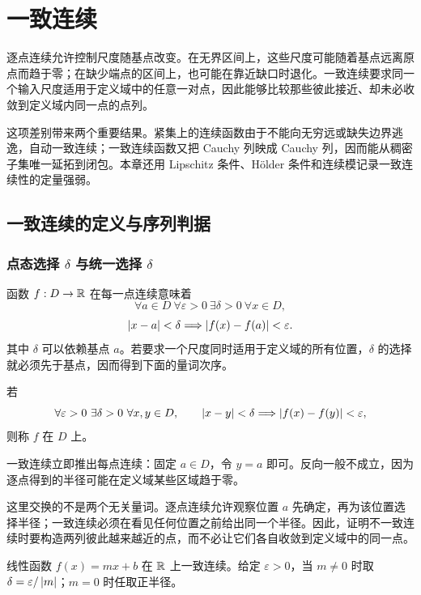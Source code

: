 \chapter{一致连续}
\label{chap:uniform-continuity}

逐点连续允许控制尺度随基点改变。在无界区间上，这些尺度可能随着基点远离原点而趋于零；在缺少端点的区间上，也可能在靠近缺口时退化。一致连续要求同一个输入尺度适用于定义域中的任意一对点，因此能够比较那些彼此接近、却未必收敛到定义域内同一点的点列。

这项差别带来两个重要结果。紧集上的连续函数由于不能向无穷远或缺失边界逃逸，自动一致连续；一致连续函数又把 Cauchy 列映成 Cauchy 列，因而能从稠密子集唯一延拓到闭包。本章还用 Lipschitz 条件、Hölder 条件和连续模记录一致连续性的定量强弱。

\section{一致连续的定义与序列判据}

\subsection{点态选择 \texorpdfstring{\(\delta\)}{delta} 与统一选择 \texorpdfstring{\(\delta\)}{delta}}


函数 \(f:D\to\mathbb{R}\) 在每一点连续意味着
\[
 \forall a\in D\ \forall\varepsilon>0\ \exists\delta>0\ \forall x\in D,
\]
\[
 \left|x-a\right|<\delta\Longrightarrow\left|f(x)-f(a)\right|<\varepsilon.
\]
其中 \(\delta\) 可以依赖基点 \(a\)。若要求一个尺度同时适用于定义域的所有位置，\(\delta\) 的选择就必须先于基点，因而得到下面的量词次序。

\begin{definition}[一致连续]
若
\[
 \forall\varepsilon>0\ \exists\delta>0\ \forall x,y\in D,\qquad
 \abs{x-y}<\delta\Longrightarrow\abs{f(x)-f(y)}<\varepsilon,
\]
则称 \(f\) 在 \(D\) 上。
\end{definition}

一致连续立即推出每点连续：固定 \(a\in D\)，令 \(y=a\) 即可。反向一般不成立，因为逐点得到的半径可能在定义域某些区域趋于零。

这里交换的不是两个无关量词。逐点连续允许观察位置 \(a\) 先确定，再为该位置选择半径；一致连续必须在看见任何位置之前给出同一个半径。因此，证明不一致连续时要构造两列彼此越来越近的点，而不必让它们各自收敛到定义域中的同一点。

\begin{example}
线性函数 \(f(x)=mx+b\) 在 \(\mathbb{R}\) 上一致连续。给定 \(\varepsilon>0\)，当 \(m\ne0\) 时取 \(\delta=\varepsilon/\left|m\right|\)；\(m=0\) 时任取正半径。
\end{example}

